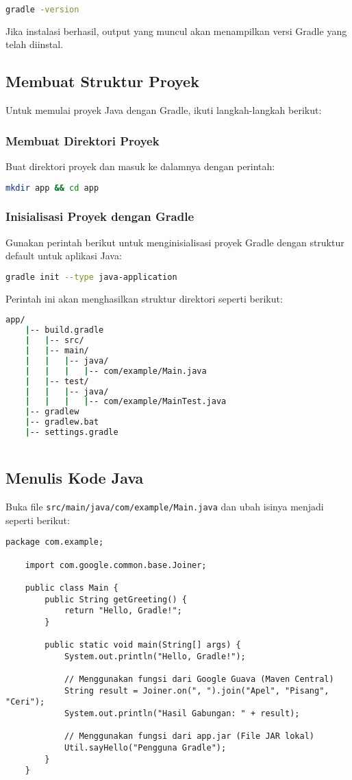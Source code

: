 \begin{lstlisting}[language=bash]
	gradle -version
\end{lstlisting}

Jika instalasi berhasil, output yang muncul akan menampilkan versi Gradle yang telah diinstal.


\subsection{Membuat Struktur Proyek}
Untuk memulai proyek Java dengan Gradle, ikuti langkah-langkah berikut:

\subsubsection{Membuat Direktori Proyek}
Buat direktori proyek dan masuk ke dalamnya dengan perintah:
\begin{lstlisting}[language=bash]
	mkdir app && cd app
\end{lstlisting}

\subsubsection{Inisialisasi Proyek dengan Gradle}
Gunakan perintah berikut untuk menginisialisasi proyek Gradle dengan struktur default untuk aplikasi Java:
\begin{lstlisting}[language=bash]
	gradle init --type java-application
\end{lstlisting}

Perintah ini akan menghasilkan struktur direktori seperti berikut:
\begin{lstlisting}[language=bash]
	app/
	|-- build.gradle
	|	|-- src/
	|   |-- main/
	|   |   |-- java/
	|   |   |   |-- com/example/Main.java
	|   |-- test/
	|   |   |-- java/
	|   |   |   |-- com/example/MainTest.java
	|-- gradlew
	|-- gradlew.bat
	|-- settings.gradle
	
\end{lstlisting}

\subsection{Menulis Kode Java}
Buka file \texttt{src/main/java/com/example/Main.java} dan ubah isinya menjadi seperti berikut:
\begin{lstlisting}[style=JavaStyle]
	package com.example;
	
	import com.google.common.base.Joiner;
	
	public class Main {
		public String getGreeting() {
			return "Hello, Gradle!";
		}
		
		public static void main(String[] args) {
			System.out.println("Hello, Gradle!");
			
			// Menggunakan fungsi dari Google Guava (Maven Central)
			String result = Joiner.on(", ").join("Apel", "Pisang", "Ceri");
			System.out.println("Hasil Gabungan: " + result);
			
			// Menggunakan fungsi dari app.jar (File JAR lokal)
			Util.sayHello("Pengguna Gradle");
		}
	}
\end{lstlisting}

